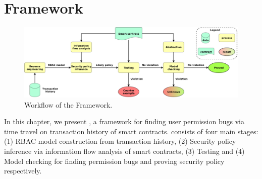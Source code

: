 \section{Framework}
\label{sec:framework}
%
\begin{figure}[t]
	\centering
	\includegraphics[scale=0.45]{Figures/Chapter4/Framework-SPCon.pdf}
	\caption{Workflow of the \spcon Framework.}
	\label{fig:framework}
\end{figure}
%
%
In this chapter, we present \spcon, a framework for finding user permission bugs via time travel on transaction history of smart contracts.
\spcon consists of four main stages: (1) RBAC model construction from transaction history,
(2) Security policy inference via information flow analysis of smart contracts,
(3) Testing and (4) Model checking for finding permission bugs and proving security policy respectively.
%
%
%

